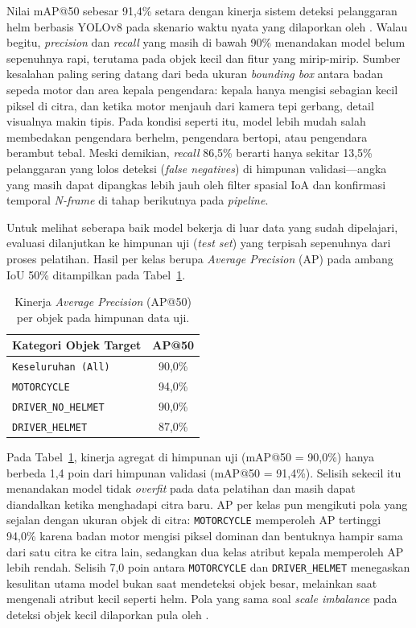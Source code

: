Nilai mAP@50 sebesar 91,4\% setara dengan kinerja sistem deteksi pelanggaran helm berbasis YOLOv8 pada skenario waktu nyata yang dilaporkan oleh \cite{aboah2023helmet}. Walau begitu, \textit{precision} dan \textit{recall} yang masih di bawah 90\% menandakan model belum sepenuhnya rapi, terutama pada objek kecil dan fitur yang mirip-mirip. Sumber kesalahan paling sering datang dari beda ukuran \textit{bounding box} antara badan sepeda motor dan area kepala pengendara: kepala hanya mengisi sebagian kecil piksel di citra, dan ketika motor menjauh dari kamera tepi gerbang, detail visualnya makin tipis. Pada kondisi seperti itu, model lebih mudah salah membedakan pengendara berhelm, pengendara bertopi, atau pengendara berambut tebal. Meski demikian, \textit{recall} 86,5\% berarti hanya sekitar 13,5\% pelanggaran yang lolos deteksi (\textit{false negatives}) di himpunan validasi---angka yang masih dapat dipangkas lebih jauh oleh filter spasial IoA dan konfirmasi temporal \textit{N-frame} di tahap berikutnya pada \textit{pipeline}.

Untuk melihat seberapa baik model bekerja di luar data yang sudah dipelajari, evaluasi dilanjutkan ke himpunan uji (\textit{test set}) yang terpisah sepenuhnya dari proses pelatihan. Hasil per kelas berupa \textit{Average Precision} (AP) pada ambang IoU 50\% ditampilkan pada Tabel~\ref{tab:metrik-test-objek}.

\begin{table}[htbp]
\centering
\caption{Kinerja \textit{Average Precision} (AP@50) per objek pada himpunan data uji.}
\label{tab:metrik-test-objek}
\begin{tabular}{lc}
\toprule
\textbf{Kategori Objek Target} & \textbf{AP@50} \\
\midrule
\texttt{Keseluruhan (All)}  & 90,0\% \\
\texttt{MOTORCYCLE}         & 94,0\% \\
\texttt{DRIVER\_NO\_HELMET} & 90,0\% \\
\texttt{DRIVER\_HELMET}     & 87,0\% \\
\bottomrule
\end{tabular}
\end{table}

Pada Tabel~\ref{tab:metrik-test-objek}, kinerja agregat di himpunan uji (mAP@50 = 90,0\%) hanya berbeda 1,4 poin dari himpunan validasi (mAP@50 = 91,4\%). Selisih sekecil itu menandakan model tidak \textit{overfit} pada data pelatihan dan masih dapat diandalkan ketika menghadapi citra baru. AP per kelas pun mengikuti pola yang sejalan dengan ukuran objek di citra: \texttt{MOTORCYCLE} memperoleh AP tertinggi 94,0\% karena badan motor mengisi piksel dominan dan bentuknya hampir sama dari satu citra ke citra lain, sedangkan dua kelas atribut kepala memperoleh AP lebih rendah. Selisih 7,0 poin antara \texttt{MOTORCYCLE} dan \texttt{DRIVER\_HELMET} menegaskan kesulitan utama model bukan saat mendeteksi objek besar, melainkan saat mengenali atribut kecil seperti helm. Pola yang sama soal \textit{scale imbalance} pada deteksi objek kecil dilaporkan pula oleh \cite{oksuz2020imbalance}.

